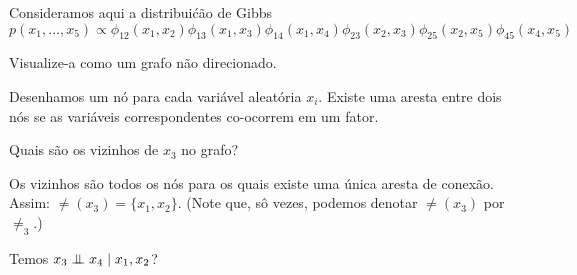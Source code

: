 
\label{ex:visualising-gibbs-distributions}
Consideramos aqui a distribui\'c\~ao de Gibbs
$$p(x_1, \ldots, x_5) \propto \phi_{12}(x_1,x_2)\phi_{13}(x_1,x_3)\phi_{14}(x_1,x_4)\phi_{23}(x_2,x_3)\phi_{25}(x_2,x_5)\phi_{45}(x_4,x_5)$$

\begin{exenumerate}
    \item Visualize-a como um grafo n\~ao direcionado.
    
    \begin{solution}
        Desenhamos um n\'o para cada vari\'avel aleat\'oria $x_i$. Existe uma aresta entre dois n\'os se as vari\'aveis correspondentes co-ocorrem em um fator.
        \begin{center}
        \end{center}
        
    \end{solution}
    
    \item Quais s\~ao os vizinhos de $x_3$ no grafo?
    
    \begin{solution}
        Os vizinhos s\~ao todos os n\'os para os quais existe uma \'unica aresta de conex\~ao. Assim:
        $\ne(x_3) = \{x_1, x_2\}$. (Note que, s\^o vezes, podemos denotar $\ne(x_3)$ por $\ne_3$.)
    \end{solution}
    
    \item Temos $x_3 \mathrel{\perp\mspace{-10mu}\perp} x_4 \mid x_1, x_2$?
    

\end{exenumerate}
